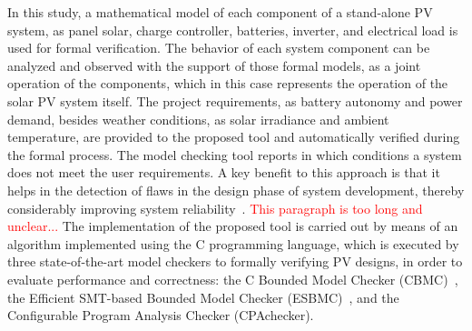 In this study, a mathematical model of each component of a stand-alone PV system, as panel solar, charge controller, batteries, inverter, and electrical load is used for formal verification. The behavior of each system component can be analyzed and observed with the support of those formal models, as a joint operation of the components, which in this case represents the operation of the solar PV system itself. The project requirements, as battery autonomy and power demand, besides weather conditions, as solar irradiance and ambient temperature, are provided to the proposed tool and automatically verified during the formal process. The model checking tool reports in which conditions a system does not meet the user requirements. A key benefit to this approach is that it helps in the detection of flaws in the design phase of system development, thereby considerably improving system reliability~\cite{Akram2018}. 
\textcolor{red}{This paragraph is too long and unclear...}
The implementation of the proposed tool is carried out by means of an algorithm implemented using the C programming language, which is executed by three state-of-the-art model checkers to formally verifying PV designs, in order to evaluate performance and correctness: the C Bounded Model Checker (CBMC)~\cite{Kroening}, the Efficient SMT-based Bounded Model Checker (ESBMC)~\cite{esbmc2018}, and the Configurable Program Analysis Checker (CPAchecker).


